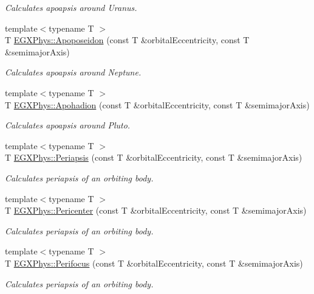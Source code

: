 \begin{DoxyCompactItemize}
\begin{DoxyCompactList}\small\item\em Calculates apoapsis around Uranus. \end{DoxyCompactList}\item 
{\footnotesize template$<$typename T $>$ }\\T \hyperlink{group___astrophysics_ga89679654fff13176e989536163a27f9d}{E\+G\+X\+Phys\+::\+Apoposeidon} (const T \&orbital\+Eccentricity, const T \&semimajor\+Axis)
\begin{DoxyCompactList}\small\item\em Calculates apoapsis around Neptune. \end{DoxyCompactList}\item 
{\footnotesize template$<$typename T $>$ }\\T \hyperlink{group___astrophysics_gaa16847ddc5763c327067075dcb6a3353}{E\+G\+X\+Phys\+::\+Apohadion} (const T \&orbital\+Eccentricity, const T \&semimajor\+Axis)
\begin{DoxyCompactList}\small\item\em Calculates apoapsis around Pluto. \end{DoxyCompactList}\item 
{\footnotesize template$<$typename T $>$ }\\T \hyperlink{group___astrophysics_ga4414ac75539371ec874a3d25cad6c9fe}{E\+G\+X\+Phys\+::\+Periapsis} (const T \&orbital\+Eccentricity, const T \&semimajor\+Axis)
\begin{DoxyCompactList}\small\item\em Calculates periapsis of an orbiting body. \end{DoxyCompactList}\item 
{\footnotesize template$<$typename T $>$ }\\T \hyperlink{group___astrophysics_gac4c419a87a5802cf6afc98f50792e99f}{E\+G\+X\+Phys\+::\+Pericenter} (const T \&orbital\+Eccentricity, const T \&semimajor\+Axis)
\begin{DoxyCompactList}\small\item\em Calculates periapsis of an orbiting body. \end{DoxyCompactList}\item 
{\footnotesize template$<$typename T $>$ }\\T \hyperlink{group___astrophysics_gaff62669fb364a245cb85f9a91d8ea71f}{E\+G\+X\+Phys\+::\+Perifocus} (const T \&orbital\+Eccentricity, const T \&semimajor\+Axis)
\begin{DoxyCompactList}\small\item\em Calculates periapsis of an orbiting body. \end{DoxyCompactList}\item 

\end{DoxyCompactItemize}
